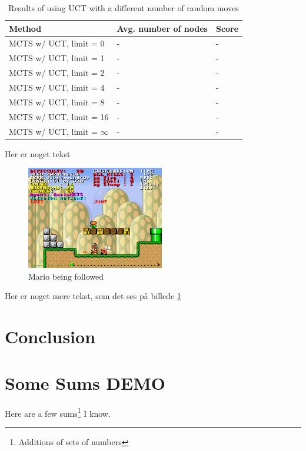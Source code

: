 \documentclass[10pt,a4paper,twoside]{article}
\begin{document}
\begin{table}
	\centering
\begin{tabular}[h]{| l | l | l |}
	\hline
	\textbf{Method} & \textbf{Avg. number of nodes} & \textbf{Score} \\ \hline
	MCTS w/ UCT, limit = 0			& - & - \\ \hline
	MCTS w/ UCT, limit = 1			& - & - \\ \hline
	MCTS w/ UCT, limit = 2			& - & - \\ \hline
	MCTS w/ UCT, limit = 4			& - & - \\ \hline
	MCTS w/ UCT, limit = 8			& - & - \\ \hline
	MCTS w/ UCT, limit = 16			& - & - \\ \hline
	MCTS w/ UCT, limit = $\infty$	& - & - \\ \hline
\end{tabular}
	\caption{Results of using UCT with a different number of random moves}
	\label{tab:uct_results}
\end{table}

Her er noget tekst

\begin{figure}[h] %
\centering
\includegraphics[width=6cm]{img/Forfulgt}
\caption{Mario being followed}
\label{fig:followed}
\end{figure}

Her er noget mere tekst, som det ses på billede \ref{fig:followed}

\section{Conclusion}

\section{Some Sums DEMO}

Here are a few sums\footnote{Additions of sets of numbers}  I know.\label{sec:formulas}
\end{document}
